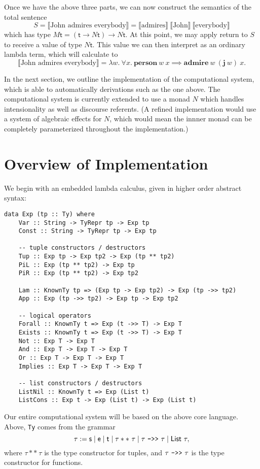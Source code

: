 \documentclass{article}
\newcommand{\Te}{\textsf{e}}
\newcommand{\Tt}{\textsf{t}}
\newcommand{\Ts}{\textsf{s}}
\begin{document}
Once we have the above three parts, we can now construct the semantics of the total sentence
$$ S = \llbracket \text{John admires everybody} \rrbracket = \llbracket \text{admires} \rrbracket\ \llbracket \text{John} \rrbracket\ \llbracket \text{everybody} \rrbracket$$
which has type $M \Tt = (\Tt \to N \Tt) \to N \Tt$. At this point, we may apply \textsf{return} to $S$ to receive a value of type $N \Tt$. This value we can then interpret as an ordinary lambda term, which will calculate to
$$\llbracket \text{John admires everybody} \rrbracket = \lambda w.\ \forall x.\ \textbf{person}\ w\ x \implies \mathbf{admire}\ w\ (\mathbf{j}\ w)\ x.$$

In the next section, we outline the implementation of the computational system, which is able to automatically derivations such as the one above. The computational system is currently extended to use a monad $N$ which handles intensionality as well as discourse referents. (A refined implementation would use a system of algebraic effects for $N$, which would mean the innner monad can be completely parameterized throughout the implementation.)

\section{Overview of Implementation}

We begin with an embedded lambda calculus, given in higher order abstract syntax:
\begin{lstlisting}
data Exp (tp :: Ty) where
    Var :: String -> TyRepr tp -> Exp tp
    Const :: String -> TyRepr tp -> Exp tp

    -- tuple constructors / destructors
    Tup :: Exp tp -> Exp tp2 -> Exp (tp ** tp2)
    PiL :: Exp (tp ** tp2) -> Exp tp
    PiR :: Exp (tp ** tp2) -> Exp tp2

    Lam :: KnownTy tp => (Exp tp -> Exp tp2) -> Exp (tp ->> tp2)
    App :: Exp (tp ->> tp2) -> Exp tp -> Exp tp2

    -- logical operators
    Forall :: KnownTy t => Exp (t ->> T) -> Exp T
    Exists :: KnownTy t => Exp (t ->> T) -> Exp T
    Not :: Exp T -> Exp T
    And :: Exp T -> Exp T -> Exp T
    Or :: Exp T -> Exp T -> Exp T
    Implies :: Exp T -> Exp T -> Exp T

    -- list constructors / destructors
    ListNil :: KnownTy t => Exp (List t)
    ListCons :: Exp t -> Exp (List t) -> Exp (List t)
\end{lstlisting}

Our entire computational system will be based on the above core language. Above, \verb|Ty| comes from the grammar
\[ \tau := \Ts \mid \Te \mid \Tt \mid \tau **\ \tau \mid \tau\ \verb|->>|\ \tau \mid \textsf{List}\ \tau,\]
where $\tau **\ \tau$ is the type constructor for tuples, and $\tau\ \verb|->>|\ \tau$ is the type constructor for functions.
\end{document}
